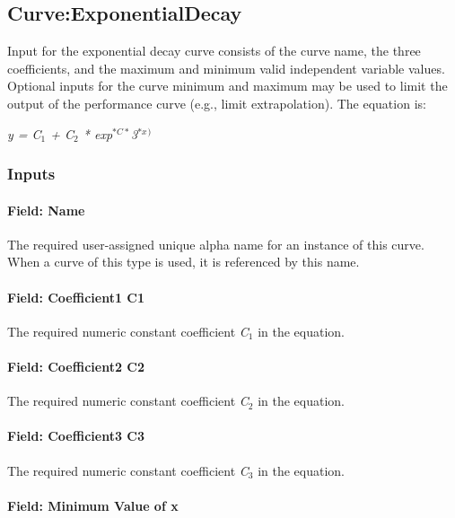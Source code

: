\subsection{Curve:ExponentialDecay}\label{curveexponentialdecay}

Input for the exponential decay curve consists of the curve name, the three coefficients, and the maximum and minimum valid independent variable values. Optional inputs for the curve minimum and maximum may be used to limit the output of the performance curve (e.g., limit extrapolation). The equation is:

\emph{y = C\(_{1}\) + C\(_{2}\) * exp}\(^{*C*}\)\emph{3\(^{*x}\)}\(^{)}\)

\subsubsection{Inputs}\label{inputs-17-005}

\paragraph{Field: Name}\label{field-name-17-004}

The required user-assigned unique alpha name for an instance of this curve. When a curve of this type is used, it is referenced by this name.

\paragraph{Field: Coefficient1 C1}\label{field-coefficient1-c1-4}

The required numeric constant coefficient \emph{C\(_{1}\)} in the equation.

\paragraph{Field: Coefficient2 C2}\label{field-coefficient2-c2-4}

The required numeric constant coefficient \emph{C\(_{2}\)} in the equation.

\paragraph{Field: Coefficient3 C3}\label{field-coefficient3-c3-4}

The required numeric constant coefficient \emph{C\(_{3}\)} in the equation.

\paragraph{Field: Minimum Value of x}\label{field-minimum-value-of-x-16}

